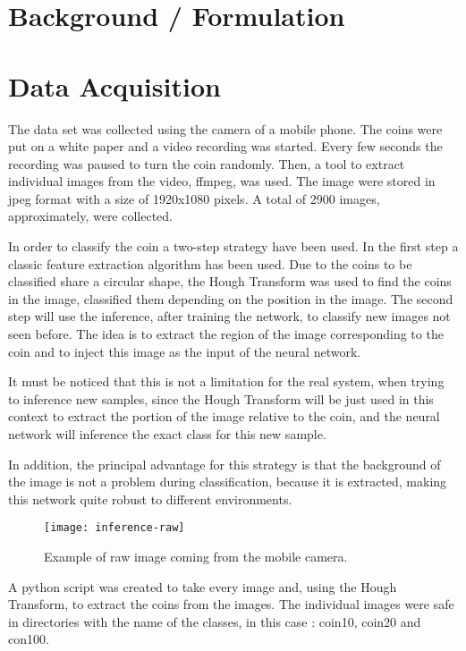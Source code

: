 \documentclass[10pt,journal,compsoc]{IEEEtran}
\begin{document}
\section{Background / Formulation}
		
\section{Data Acquisition}

The data set was collected using the camera of a mobile phone. The coins were put on a white paper and a video recording was started. Every few seconds the recording was paused to turn the coin randomly. Then, a tool to extract individual images from the video, ffmpeg, was used. The image were stored in jpeg format with a size of 1920x1080 pixels. A total of 2900 images, approximately, were collected.

In order to classify the coin a two-step strategy have been used. In the first step a classic feature extraction algorithm has been used. Due to the coins to be classified share a circular shape, the Hough Transform was used to find the coins in the image, classified them depending on the position in the image. The second step will use the inference, after training the network, to classify new images not seen before. The idea is to extract the region of the image corresponding to the coin and to inject this image as the input of the neural network.

It must be noticed that this is not a limitation for the real system, when trying to inference new samples, since the Hough Transform will be just used in this context to extract the portion of the image relative to the coin, and the neural network will inference the exact class for this new sample. 

In addition, the principal advantage for this strategy is that the background of the image is not a problem during classification, because it is extracted, making this network quite robust to different environments.


\begin{figure}[h]
\centering
\texttt{[image: inference-raw]}
\caption{Example of raw image coming from the mobile camera.}
\label{fig:figure1}
\end{figure}

A python script was created to take every image and, using the Hough Transform, to extract the coins from the images. The individual images were safe in directories with the name of the classes, in this case : coin10, coin20 and con100.
\end{document}
